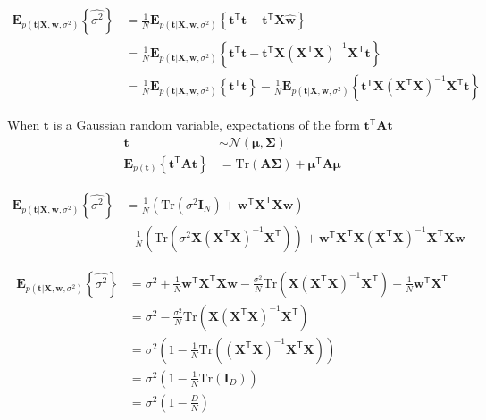 \documentclass[a4paper,11pt]{article} %
\begin{document}
\begin{align*}
\mathbf{E}_{p(\mathbf{t}|\mathbf{X},\mathbf{w},\sigma^2)}
\left\{\widehat{\sigma^2}\right\} & =
\frac{1}{N} \mathbf{E}_{p(\mathbf{t}|\mathbf{X},\mathbf{w},\sigma^2)}
\left\{
\mathbf{t}^{\mathsf{T}}\mathbf{t} - 
\mathbf{t}^{\mathsf{T}}\mathbf{X}\widehat{\mathbf{w}}
\right\} \\
& = \frac{1}{N}\mathbf{E}_{p(\mathbf{t}|\mathbf{X},\mathbf{w},\sigma^2)}
\left\{
\mathbf{t}^{\mathsf{T}}\mathbf{t} - 
\mathbf{t}^{\mathsf{T}}\mathbf{X} (\mathbf{X}^{\mathsf{T}}\mathbf{X})^{-1}
\mathbf{X}^{\mathsf{T}}\mathbf{t}
\right\} \\
& = \frac{1}{N}\mathbf{E}_{p(\mathbf{t}|\mathbf{X},\mathbf{w},\sigma^2)}
\left\{ \mathbf{t}^{\mathsf{T}}\mathbf{t} \right\} -
\frac{1}{N}\mathbf{E}_{p(\mathbf{t}|\mathbf{X},\mathbf{w},\sigma^2)}
\left\{
\mathbf{t}^{\mathsf{T}}\mathbf{X} (\mathbf{X}^{\mathsf{T}}\mathbf{X})^{-1}
\mathbf{X}^{\mathsf{T}}\mathbf{t}
\right\}
\end{align*}

When $\mathbf{t}$ is a Gaussian random variable, expectations of the form
$\mathbf{t}^{\mathsf{T}}\mathbf{A}\mathbf{t}$
\begin{align*}
\mathbf{t} & \sim \mathcal{N}(\boldsymbol{\mu},\boldsymbol{\Sigma}) \\
\mathbf{E}_{p(\mathbf{t})}\left\{
\mathbf{t}^{\mathsf{T}}\mathbf{A}\mathbf{t}
\right\} & = \mathrm{Tr}(\mathbf{A}\boldsymbol{\Sigma}) + \boldsymbol{\mu}^{\mathsf{T}}
\mathbf{A}\boldsymbol{\mu}
\end{align*}

\begin{align*}
\mathbf{E}_{p(\mathbf{t}|\mathbf{X},\mathbf{w},\sigma^2)}
\left\{\widehat{\sigma^2}\right\} & = \frac{1}{N}
\left(
\mathrm{Tr}(\sigma^2\mathbf{I}_{N}) + \mathbf{w}^{\mathsf{T}}\mathbf{X}^{\mathsf{T}}
\mathbf{X}\mathbf{w}
\right) \\
& - \frac{1}{N}\left(
\mathrm{Tr}(\sigma^2\mathbf{X}(\mathbf{X}^{\mathsf{T}}\mathbf{X})^{-1}\mathbf{X}^{\mathsf{T}})
\right) +
\mathbf{w}^{\mathsf{T}}\mathbf{X}^{\mathsf{T}}
\mathbf{X}(\mathbf{X}^{\mathsf{T}}\mathbf{X})^{-1}\mathbf{X}^{\mathsf{T}}\mathbf{X}\mathbf{w}
\end{align*}


\begin{align*}
\mathbf{E}_{p(\mathbf{t}|\mathbf{X},\mathbf{w},\sigma^2)}
\left\{\widehat{\sigma^2}\right\} & = \sigma^2 +
\frac{1}{N}\mathbf{w}^{\mathsf{T}}\mathbf{X}^{\mathsf{T}}
\mathbf{X}\mathbf{w} -
\frac{\sigma^2}{N}
\mathrm{Tr}( \mathbf{X} (\mathbf{X}^{\mathsf{T}}\mathbf{X})^{-1}\mathbf{X}^{\mathsf{T}} )
- \frac{1}{N}\mathbf{w}^{\mathsf{T}}\mathbf{X}^{\mathsf{T}} \\
& = \sigma^2 -
\frac{\sigma^2}{N}
\mathrm{Tr}( \mathbf{X} (\mathbf{X}^{\mathsf{T}}\mathbf{X})^{-1}\mathbf{X}^{\mathsf{T}} ) \\
& = \sigma^2 \left(
1 - \frac{1}{N}\mathrm{Tr}( (\mathbf{X}^{\mathsf{T}}\mathbf{X})^{-1}\mathbf{X}^{\mathsf{T}}\mathbf{X} )
\right) \\
& = \sigma^2 \left( 1 - \frac{1}{N}\mathrm{Tr}(\mathbf{I}_{D}) \right) \\
& = \sigma^2 \left( 1 - \frac{D}{N} \right)
\end{align*}



\end{document}
